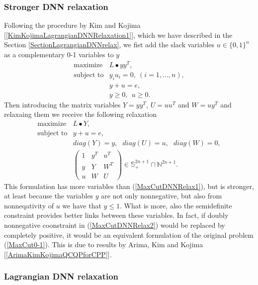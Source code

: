 \documentclass[12pt]{book}
\theoremstyle{definition}
\begin{document}
\subsubsection{Stronger DNN relaxation}
Following the procedure by Kim and Kojima [\ref{KimKojimaLagrangianDNNRelaxation1}], which we have described in the Section \ref{SectionLagrangianDNNrelax}, we fist add the slack variables $u\in\{0,1\}^n$ as a complementary 0-1 variables to $y$
\begin{equation}
\label{MaxCut complementarity formulation}
\begin{array}{ll}
\mbox{maximize} &  L\bullet yy^T, \\
\mbox{subject to} & y_iu_i = 0, \ (i = 1,\dots ,n), \\
				& y + u = e, \\
				& y\geq 0, \ \ u\geq 0.
\end{array}	
\end{equation}
Then introducing the matrix variables $Y = yy^T$,  $U = uu^T$ and $W = uy^T$  and relaxaing them we receive the following relaxation
\begin{equation}
\label{MaxCutDNNRelax2}
\begin{array}{ll}
\mbox{maximize} &  L\bullet Y, \\
\mbox{subject to} & y + u = e, \\
				& diag(Y) = y, \ \ \ diag(U) = u, \ \ \ diag(W) = 0, \\
				& \left(\begin{array}{lll}
				1 & y^T & u^T \\ 
				y & Y 	& W^T \\
				u & W 	& U
				\end{array}\right) \in\mathbb{S}^{2n+1}_+ \cap \mathbb{N}^{2n+1}.
\end{array}	
\end{equation}
This formulation has more variables than (\ref{MaxCutDNNRelax1}), but is stronger, at least because the variables $y$ are not only nonnegative, but also from nonneqativity of $u$ we have that $y\leq 1$. What is more, also the semidefinite constraint provides better links between these variables. In fact, if doubly nonnegative coonstraint in (\ref{MaxCutDNNRelax2}) would be replaced by completely positive, it would be an equivalent formulation of the original problem (\ref{MaxCut0-1}). This is due to results by Arima, Kim and Kojima [\ref{ArimaKimKojimaQCQPforCPP}].

\subsubsection{Lagrangian DNN relaxation}
\end{document}
